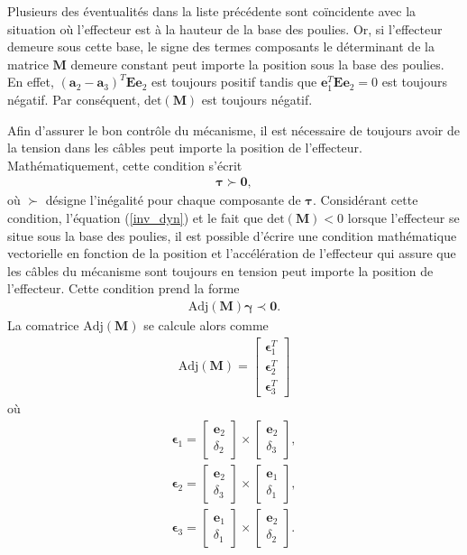 Plusieurs des éventualités dans la liste précédente sont coïncidente avec la situation où l'effecteur est à la hauteur de la base des poulies. Or, si l'effecteur demeure sous cette base, le signe des termes composants le déterminant de la matrice $\mathbf{M}$ demeure constant peut importe la position sous la base des poulies. En effet, $\left(\mathbf{a}_2-\mathbf{a}_3\right)^T\mathbf{E}\mathbf{e}_2$ est toujours positif tandis que $\mathbf{e}_1^T\mathbf{E}\mathbf{e}_2=0$ est toujours négatif. Par conséquent, $\text{det}(\mathbf{M})$ est toujours négatif.
\par 
Afin d'assurer le bon contrôle du mécanisme, il est nécessaire de toujours avoir de la tension dans les câbles peut importe la position de l'effecteur. Mathématiquement, cette condition s'écrit
\begin{align}
\bm{\tau} \succ \mathbf{0},
\end{align}
où $\succ$ désigne l'inégalité pour chaque composante de $\bm{\tau}$. Considérant cette condition, l'équation (\ref{inv_dyn}) et le fait que $\text{det}(\mathbf{M})<0$ lorsque l'effecteur se situe sous la base des poulies, il est possible d'écrire une condition mathématique vectorielle en fonction de la position et l'accélération de l'effecteur qui assure que les câbles du mécanisme sont toujours en tension peut importe la position de l'effecteur. Cette condition prend la forme
\begin{align} \text{Adj}(\mathbf{M})\bm{\gamma}\prec \mathbf{0}.\label{cond_ten_2} \end{align}
La comatrice $\text{Adj}(\mathbf{M})$ se calcule alors comme 
\begin{align}
\text{Adj}(\mathbf{M})=\begin{bmatrix}
\bm{\epsilon}_1^T\\
\bm{\epsilon}_2^T\\
\bm{\epsilon}_3^T
\end{bmatrix}
\label{adj_m}
\end{align}
où
\begin{align}
\bm{\epsilon}_1=\begin{bmatrix}
\mathbf{e}_2\\\delta_2
\end{bmatrix}\times \begin{bmatrix}
\mathbf{e}_2\\\delta_3
\end{bmatrix},
\label{epsi1}\\
\bm{\epsilon}_2=\begin{bmatrix}
\mathbf{e}_2\\\delta_3
\end{bmatrix}\times \begin{bmatrix}
\mathbf{e}_1\\\delta_1
\end{bmatrix},
\label{epsi2}\\
\bm{\epsilon}_3=\begin{bmatrix}
\mathbf{e}_1\\\delta_1
\end{bmatrix}\times \begin{bmatrix}
\mathbf{e}_2\\\delta_2
\end{bmatrix}.
\label{epsi3}
\end{align}
